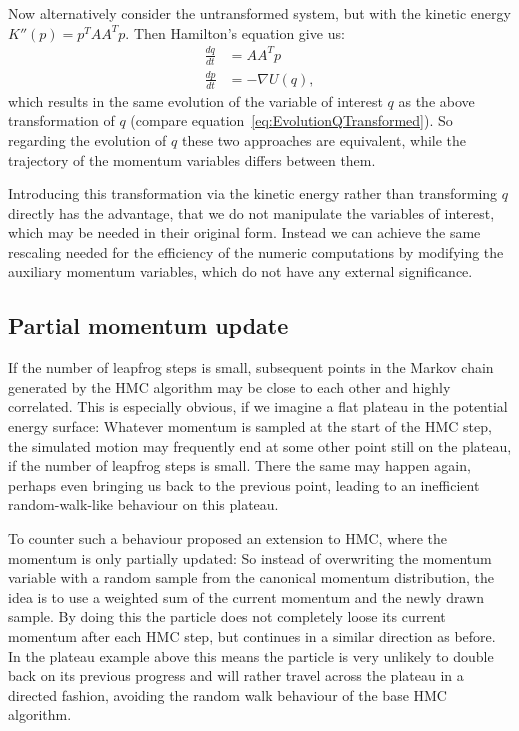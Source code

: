 Now alternatively consider the untransformed system, but with the kinetic energy $K''(p) = p^T A A^T p$. Then Hamilton's equation give us:
\begin{equation}
\begin{split}
\frac{dq}{dt} &= A A^T p \\
\frac{dp}{dt} &= - \nabla U(q),
\end{split}
\end{equation}
which results in the same evolution of the variable of interest $q$ as the above transformation of $q$ (compare equation~\eqref{eq:EvolutionQTransformed}). So regarding the evolution of $q$ these two approaches are equivalent, while the trajectory of the momentum variables differs between them.

Introducing this transformation via the kinetic energy rather than transforming $q$ directly has the advantage, that we do not manipulate the variables of interest, which may be needed in their original form. Instead we can achieve the same rescaling needed for the efficiency of the numeric computations by modifying the auxiliary momentum variables, which do not have any external significance.

\subsection{Partial momentum update}
\label{sec:PartialMomentumUpdate}
If the number of leapfrog steps is small, subsequent points in the Markov chain generated by the HMC algorithm may be close to each other and highly correlated. This is especially obvious, if we imagine a flat plateau in the potential energy surface: Whatever momentum is sampled at the start of the HMC step, the simulated motion may frequently end at some other point still on the plateau, if the number of leapfrog steps is small. There the same may happen again, perhaps even bringing us back to the previous point, leading to an inefficient random-walk-like behaviour on this plateau.

To counter such a behaviour \textcite{Horowitz1991} proposed an extension to HMC, where the momentum is only partially updated: So instead of overwriting the momentum variable with a random sample from the canonical momentum distribution, the idea is to use a weighted sum of the current momentum and the newly drawn sample. By doing this the particle does not completely loose its current momentum after each HMC step, but continues in a similar direction as before. In the plateau example above this means the particle is very unlikely to double back on its previous progress and will rather travel across the plateau in a directed fashion, avoiding the random walk behaviour of the base HMC algorithm.

